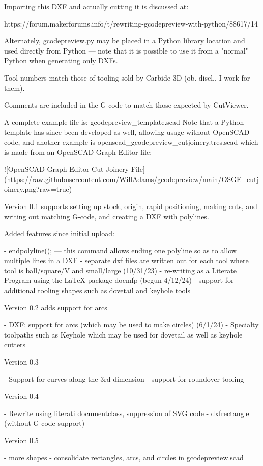 \documentclass{ltxdoc}
\begin{document}
\begin{readme}
Importing this DXF and actually cutting it is discussed at:

https://forum.makerforums.info/t/rewriting-gcodepreview-with-python/88617/14

Alternately, gcodepreview.py may be placed in a Python library location and used directly from Python --- note that it is possible to use it from a "normal" Python when generating only DXFs.

Tool numbers match those of tooling sold by Carbide 3D (ob. discl., I work for them). 

Comments are included in the G-code to match those expected by CutViewer.

A complete example file is: gcodepreview_template.scad Note that a Python template has since been developed as well, allowing usage without OpenSCAD code, and another example is openscad_gcodepreview_cutjoinery.tres.scad which is made from an OpenSCAD Graph Editor file:

![OpenSCAD Graph Editor Cut Joinery File](https://raw.githubusercontent.com/WillAdams/gcodepreview/main/OSGE_cutjoinery.png?raw=true)

Version 0.1 supports setting up stock, origin, rapid positioning, making cuts, and writing out matching G-code, and creating a DXF with polylines.

Added features since initial upload:

 - endpolyline(); --- this command allows ending one polyline so as to allow multiple lines in a DXF
 - separate dxf files are written out for each tool where tool is ball/square/V and small/large (10/31/23)
 - re-writing as a Literate Program using the LaTeX package docmfp (begun 4/12/24) 
 - support for additional tooling shapes such as dovetail and keyhole tools

Version 0.2 adds support for arcs 

 - DXF: support for arcs (which may be used to make circles) (6/1/24)
 - Specialty toolpaths such as Keyhole which may be used for dovetail as well as keyhole cutters

Version 0.3 

 - Support for curves along the 3rd dimension
 - support for roundover tooling
 
Version 0.4

 - Rewrite using literati documentclass, suppression of SVG code
 - dxfrectangle (without G-code support)

Version 0.5

 - more shapes
 - consolidate rectangles, arcs, and circles in gcodepreview.scad
 

\end{readme}
\end{document}
